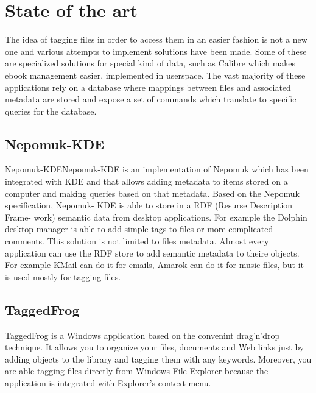 


\section{State of the art}

The idea of tagging files in order to access them in an easier fashion is not
a new one and various attempts to implement solutions have been made. Some of
these are specialized solutions for special kind of data, such as Calibre\cite{calibre}
which makes ebook management easier, implemented in userspace. The vast majority
of these applications rely on a database where mappings between files and 
associated metadata are stored and expose a set of commands which translate
to specific queries for the database.  

\subsection[Nepomuk-KDE]{Nepomuk-KDE\cite{nepomuk}}
Nepomuk-KDENepomuk-KDE is an implementation of Nepomuk which
has been integrated with KDE and that allows adding metadata
to items stored on a computer and making queries based on
that metadata. Based on the Nepomuk specification, Nepomuk-
KDE is able to store in a RDF (Resurse Description Frame-
work) semantic data from desktop applications. For example
the Dolphin desktop manager is able to add simple tags to files
or more complicated comments. This solution is not limited
to files metadata. Almost every application can use the RDF
store to add semantic metadata to theire objects. For example
KMail can do it for emails, Amarok can do it for music files,
but it is used mostly for tagging files.


\subsection{TaggedFrog}TaggedFrog\cite{taggedfrog} is a Windows application 
based on the convenint drag'n'drop technique. It allows you to organize your files, 
documents and Web links just by adding objects to the library and tagging them with 
any keywords. Moreover, you are able tagging files directly from Windows File Explorer 
because the application is integrated with Explorer's context menu.

